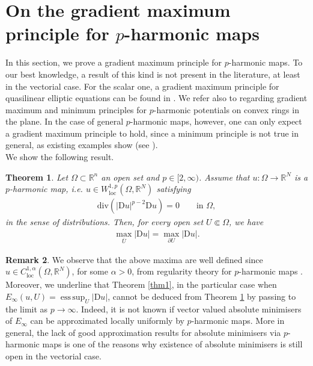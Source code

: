 \documentclass[a4paper,11pt]{article}
\numberwithin{equation}{section}
\newtheorem{Theorem}{Theorem}[section]
\newcommand{\numberset}{\mathbb}
\newcommand{\Om}{\Omega}
\newcommand{\R}{\numberset{R}}
\newcommand{\rom}{\mathrm}
\DeclareMathOperator*{\esssup}{ess\,sup}
\theoremstyle{definition}
\newtheorem{Remark}[Theorem]{Remark}
\begin{document}
\section{On the gradient maximum principle for $p$-harmonic maps}\label{sec grad}
In this section, we prove a gradient maximum principle for $p$-harmonic maps. To our best knowledge, a result of this kind is not present in the literature, at least in the vectorial case. For the scalar one, a gradient maximum principle for quasilinear elliptic equations can be found in \cite[Chapter 15]{GT}. We refer also to \cite[Appendix B]{PZZ} regarding gradient maximum and minimum principles for $p$-harmonic potentials on convex rings in the plane. In the case of general $p$-harmonic maps, however, one can only expect a gradient maximum principle to hold, since a minimum principle is not true in general, as existing examples show (see \cite{BBDS}).\\
We show the following result.
\begin{Theorem}\label{thm p}
Let $\Om\subset\R^n$ an open set and $p\in[2,\infty)$. Assume that $u:\Om\to\R^N$ is a $p$-harmonic map, i.e. $u\in W^{1,p}_{\mathrm{loc}}(\Om,\R^N)$ satisfying
\begin{align}\label{p eq}
\mathrm{div} (|\rom Du|^{p-2}\rom Du)=0\qquad\mbox{in }\Om,
\end{align}
in the sense of distributions. Then, for every open set $U\Subset \Om$, we have
\begin{align}\label{GMP}
\max_{\overline U}|\rom Du|=\max_{\partial U}|\rom Du|.
\end{align}
\end{Theorem}

\begin{Remark}\label{rem holder}
We observe that the above maxima are well defined since $u\in C^{1,\alpha}_{\mathrm{loc}}(\Om,\R^N)$, for some $\alpha>0$, from regularity theory for $p$-harmonic maps \cite{U}.\\
Moreover, we underline that Theorem \ref{thm1}, in the particular case when $E_\infty(u,U)=\esssup_U|\rom Du|$, cannot be deduced from Theorem \ref{thm p} by passing to the limit as $p\to \infty$. Indeed, it is not known if vector valued absolute minimisers of $E_\infty$ can be approximated locally uniformly by $p$-harmonic maps. More in general, the lack of good approximation results for absolute minimisers via $p$-harmonic maps is one of the reasons why existence of absolute minimisers is still open in the vectorial case. 
\end{Remark}
\end{document}
